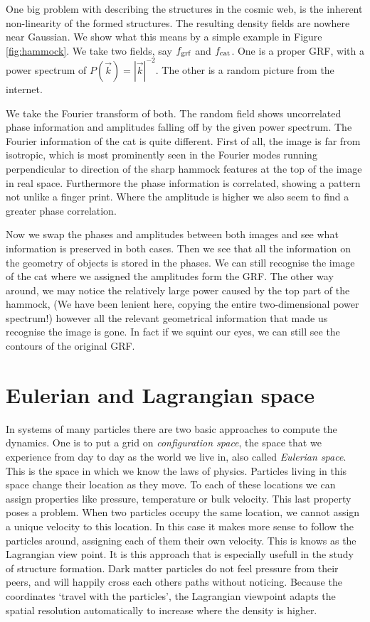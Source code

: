 \begin{subappendices}
One big problem with describing the structures in the cosmic web, is the inherent non-linearity of the formed structures. The resulting density fields are nowhere near Gaussian. We show what this means by a simple example in Figure \ref{fig:hammock}. We take two fields, say $f_{\rm grf}$ and $f_{\rm cat}$. One is a proper \ac{GRF}, with a power spectrum of $P(\vec{k}) = |\vec{k}|^{-2}$. The other is a random picture from the internet.

We take the Fourier transform of both. The random field shows uncorrelated phase information and amplitudes falling off by the given power spectrum. The Fourier information of the cat is quite different. First of all, the image is far from isotropic, which is most prominently seen in the Fourier modes running perpendicular to direction of the sharp hammock features at the top of the image in real space.
Furthermore the phase information is correlated, showing a pattern not unlike a finger print. Where the amplitude is higher we also seem to find a greater phase correlation.

Now we swap the phases and amplitudes between both images and see what information is preserved in both cases. Then we see that all the information on the geometry of objects is stored in the phases. We can still recognise the image of the cat where we assigned the amplitudes form the \ac{GRF}. The other way around, we may notice the relatively large power caused by the top part of the hammock, (We have been lenient here, copying the entire two-dimensional power spectrum!) however all the relevant geometrical information that made us recognise the image is gone. In fact if we squint our eyes, we can still see the contours of the original \ac{GRF}.

\clearpage
\section{Eulerian and Lagrangian space}\label{section:eureianlagrangian}
In systems of many particles there are two basic approaches to compute the dynamics.  One is to put a grid on \emph{configuration space}, the space that we experience from day to day as the world we live in, also called \emph{Eulerian space}. This is the space in which we know the laws of physics. Particles living in this space change their location as they move. To each of these locations we can assign properties like pressure, temperature or bulk velocity. This last property poses a problem. When two particles occupy the same location, we cannot assign a unique velocity to this location.
In this case it makes more sense to follow the particles around, assigning each of them their own velocity. This is knows as the Lagrangian view point. It is this approach that is especially usefull in the study of structure formation.  Dark matter particles do not feel pressure from their peers, and will happily cross each others paths without noticing. Because the coordinates `travel with the particles', the Lagrangian viewpoint adapts the spatial resolution automatically to increase where the density is higher.


\end{subappendices}
